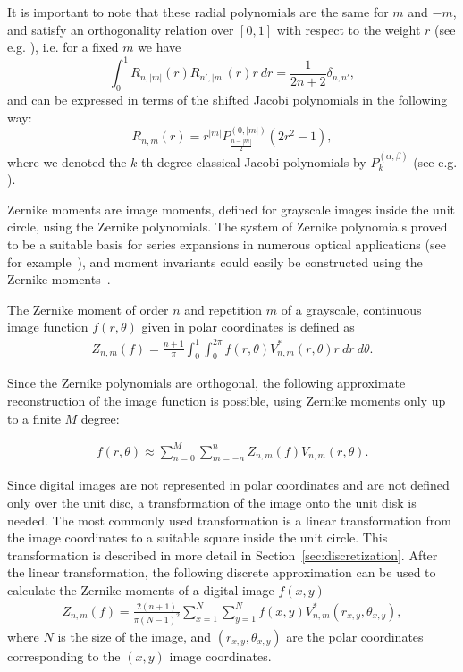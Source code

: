 It is important to note that these radial polynomials are the same for $m$ and $-m$, and satisfy an orthogonality relation over $[0,1]$ with respect to the weight $r$ (see e.g. \cite{schipp}), i.e. for a fixed $m$ we have
\begin{equation}\label{Rortho}
	\int_0^1 R_{n,|m|}(r) R_{n',|m|}(r)r\ dr  = \frac{1}{2n+2} \delta_{n,n'},
\end{equation}
and can be expressed in terms of the shifted Jacobi polynomials in the following way:
\begin{equation}\label{RJacobi}
	R_{n,m}(r) = r^{|m|} P_{\frac{n - |m|}{2}}^{(0,|m|)}(2r^2-1),
\end{equation}
where we denoted the $k$-th degree classical Jacobi polynomials by $P_k^{(\alpha,\beta)}$ (see e.g. \cite{Szego}).


Zernike moments are image moments, defined for grayscale images inside the unit circle, using the Zernike polynomials.
The system of Zernike polynomials proved to be a suitable basis for series expansions in numerous optical applications (see for example~\cite{wavefront,optical_human_eye,opt_surf}), and moment invariants could easily be constructed using the Zernike moments~\cite{zernike_moments}. 

The Zernike moment of order $n$ and repetition $m$ of a grayscale, continuous image function $f(r,\theta)$ given in polar coordinates is defined as
\begin{gather*}
  Z_{n,m}(f) = \frac{n + 1}{\pi}\int_0^1\int_0^{2\pi}f(r,\theta)V_{n,m}^{*}(r,\theta)r\ dr\ d\theta.
\end{gather*}

Since the Zernike polynomials are orthogonal, the following approximate reconstruction of the image function is possible, using Zernike moments only up to a finite $M$ degree:

\begin{gather*}
  f(r,\theta) \approx \sum_{n=0}^{M}\sum_{m=-n}^{n}Z_{n,m}(f)V_{n,m}(r,\theta).
\end{gather*}

Since digital images are not represented in polar coordinates and are not defined only over the unit disc, a transformation of the image onto the unit disk is needed. The most commonly used transformation is a linear transformation from the image coordinates to a suitable square inside the unit circle. This transformation is described in more detail in Section~\ref{sec:discretization}.
After the linear transformation, the following discrete approximation can be used to calculate the Zernike moments of a digital image $f(x,y)$
\begin{gather*}
  Z_{n,m}(f) = \frac{2(n+1)}{\pi(N-1)^2}\sum_{x=1}^{N}\sum_{y=1}^{N}f(x,y)V_{n,m}^{*}(r_{x,y},\theta_{x,y}),
\end{gather*}
where $N$ is the size of the image, and $(r_{x,y},\theta_{x,y})$ are the polar coordinates corresponding to the $(x,y)$ image coordinates.

